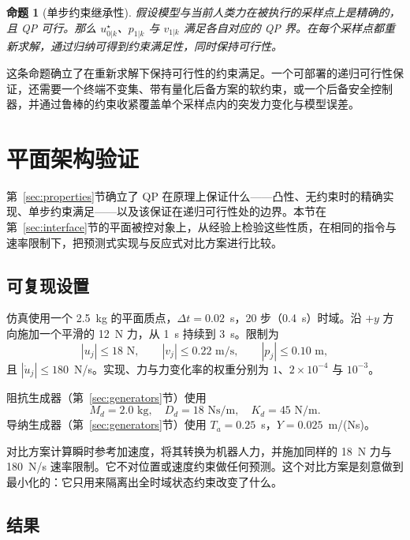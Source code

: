 \documentclass[journal]{IEEEtran}
\newtheorem{proposition}{命题}
\begin{document}
\begin{proposition}[单步约束继承性]
\label{prop:inheritance}
假设模型与当前人类力在被执行的采样点上是精确的，且 QP 可行。那么 $u_{0|k}^\star$、$p_{1|k}$ 与 $v_{1|k}$ 满足各自对应的 QP 界。在每个采样点都重新求解，通过归纳可得到约束满足性，同时保持可行性。
\end{proposition}

这条命题确立了在重新求解下保持可行性的约束满足。一个可部署的递归可行性保证，还需要一个终端不变集、带有量化后备方案的软约束，或一个后备安全控制器，并通过鲁棒的约束收紧覆盖单个采样点内的突发力变化与模型误差。

\section{平面架构验证}
\label{sec:planar}

第~\ref{sec:properties}节确立了 QP 在原理上保证什么——凸性、无约束时的精确实现、单步约束满足——以及该保证在递归可行性处的边界。本节在第~\ref{sec:interface}节的平面被控对象上，从经验上检验这些性质，在相同的指令与速率限制下，把预测式实现与反应式对比方案进行比较。

\subsection{可复现设置}

仿真使用一个 2.5~kg 的平面质点，$\Delta t=0.02$~s，20 步（0.4~s）时域。沿 $+y$ 方向施加一个平滑的 12~N 力，从 1~s 持续到 3~s。限制为
\begin{equation}
|u_j|\le18\text{ N},\qquad |v_j|\le0.22\text{ m/s},\qquad
|p_j|\le0.10\text{ m},
\end{equation}
且 $|\dot u_j|\le180$~N/s。实现、力与力变化率的权重分别为 $1$、$2\times10^{-4}$ 与 $10^{-3}$。

阻抗生成器（第~\ref{sec:generators}节）使用
\begin{equation}
M_d=2.0\text{ kg},\quad D_d=18\text{ Ns/m},\quad K_d=45\text{ N/m}.
\end{equation}
导纳生成器（第~\ref{sec:generators}节）使用 $T_a=0.25$~s，$Y=0.025$~m/(Ns)。

对比方案计算瞬时参考加速度，将其转换为机器人力，并施加同样的 18~N 力与 180~N/s 速率限制。它不对位置或速度约束做任何预测。这个对比方案是刻意做到最小化的：它只用来隔离出全时域状态约束改变了什么。

\subsection{结果}
\label{sec:planar-results}
\end{document}
